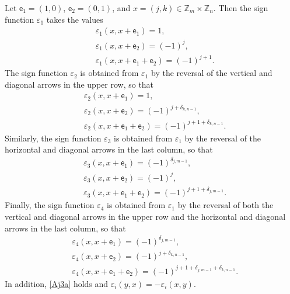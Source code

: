 \documentclass[12pt,reqno]{amsart}
\numberwithin{equation}{section}
\newcommand{\Z}{{\mathbb Z}}
\newcommand{\ep}{\varepsilon}
\newcommand{\de}{\delta}
\begin{document}
Let $\mathsf e_1=(1,0)$, $\mathsf e_2=(0,1)$, and $x=(j,k)\in \Z_m\times \Z_n$. Then  the sign function $\ep_1$ takes the values 
\begin{equation}\label{Aj3b}
\begin{aligned}
&\ep_1(x,x+\mathsf e_1)=1,\\
&\ep_1(x,x+\mathsf e_2)=(-1)^j,\\
&\ep_1(x,x+\mathsf e_1+\mathsf e_2)=(-1)^{j+1}.
\end{aligned}
\end{equation}
The sign function $\ep_2$ is obtained from $\ep_1$ by the reversal of the
vertical and diagonal arrows in the upper row, so that
\begin{equation}\label{Aj3c}
\begin{aligned}
&\ep_2(x,x+\mathsf e_1)=1,\\
&\ep_2(x,x+\mathsf e_2)=(-1)^{j+\de_{k,n-1}},\\
&\ep_2(x,x+\mathsf e_1+\mathsf e_2)=(-1)^{j+1+\de_{k,n-1}}.
\end{aligned}
\end{equation}
Similarly,
the sign function $\ep_3$ is obtained from $\ep_1$ by the reversal of the
horizontal and diagonal arrows in the last column, so that
\begin{equation}\label{Aj3d}
\begin{aligned}
&\ep_3(x,x+\mathsf e_1)=(-1)^{\de_{j,m-1}},\\
&\ep_3(x,x+\mathsf e_2)=(-1)^{j},\\
&\ep_3(x,x+\mathsf e_1+\mathsf e_2)=(-1)^{j+1+\de_{j,m-1}}.
\end{aligned}
\end{equation}
Finally, the sign function $\ep_4$ is obtained from $\ep_1$ by the reversal of  both the vertical and diagonal arrows in the upper row and the
horizontal and diagonal arrows in the last column, so that
\begin{equation}\label{Aj3e}
\begin{aligned}
&\ep_4(x,x+\mathsf e_1)=(-1)^{\de_{j,m-1}},\\
&\ep_4(x,x+\mathsf e_2)=(-1)^{j+\de_{k,n-1}},\\
&\ep_4(x,x+\mathsf e_1+\mathsf e_2)=(-1)^{j+1+\de_{j,m-1}+\de_{k,n-1}}.
\end{aligned}
\end{equation}
In addition, \eqref{Aj3a} holds and $\ep_i(y,x)=-\ep_i(x,y)$.
\end{document}
